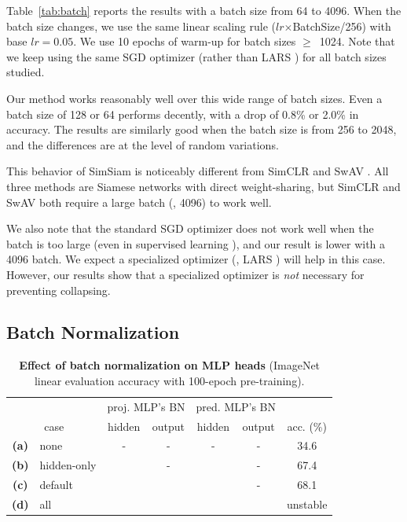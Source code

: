 \documentclass[final]{cvpr}
\newcommand{\cmark}{\checkmark} %
\newcommand{\tablestyle}[2]{\setlength{\tabcolsep}{#1}\renewcommand{\arraystretch}{#2}\centering\footnotesize}
\begin{document}
Table~\ref{tab:batch} reports the results with a batch size from 64 to 4096. When the batch size changes, we use the same linear scaling rule ($lr$$\times$BatchSize/256) \cite{Goyal2017} with base $lr\!=\!0.05$.
We use 10 epochs of warm-up \cite{Goyal2017} for batch sizes $\geq\!$~1024. Note that we keep using the same SGD optimizer (rather than LARS \cite{You2017}) for all batch sizes studied.

Our method works reasonably well over this wide range of batch sizes. Even a batch size of 128 or 64 performs decently, with a drop of 0.8\% or 2.0\% in accuracy.
The results are similarly good when the batch size is from 256 to 2048, and the differences are at the level of random variations.

This behavior of SimSiam is noticeably different from SimCLR \cite{Chen2020} and SwAV \cite{Caron2020}. All three methods are Siamese networks with direct weight-sharing,
but SimCLR and SwAV both require a large batch (\eg, 4096) to work well.

We also note that the standard SGD optimizer does not work well when the batch is too large (even in supervised learning \cite{Goyal2017,You2017}), and our result is lower with a 4096 batch.
We expect a specialized optimizer (\eg, LARS \cite{You2017}) will help in this case. However, our results show that a specialized optimizer is \emph{not} necessary for preventing collapsing.

\subsection{Batch Normalization} \label{subsec:bn}

\begin{table}[t]
\centering
\small
\tablestyle{5pt}{1.1}
\begin{tabular}{cl| cc | cc | c }
~ & ~ & \multicolumn{2}{c|}{proj. MLP's BN} & \multicolumn{2}{c|}{pred. MLP's BN}  & ~ \\
\multicolumn{2}{c|}{case}  & hidden & output & hidden & output & acc. (\%) \\
\shline
\textbf{(a)} & none & - & - & - & - & 34.6 \\
\textbf{(b)} & hidden-only & \cmark & - & \cmark & - & 67.4 \\
\textbf{(c)} & default & \cmark & \cmark & \cmark & - & 68.1 \\
\textbf{(d)} & all & \cmark & \cmark & \cmark & \cmark & unstable \\
\end{tabular}
\vspace{.5em}
\caption{\textbf{Effect of batch normalization on MLP heads} (ImageNet linear evaluation accuracy with 100-epoch pre-training).
\label{tab:bn}
}
\end{table}
\end{document}
